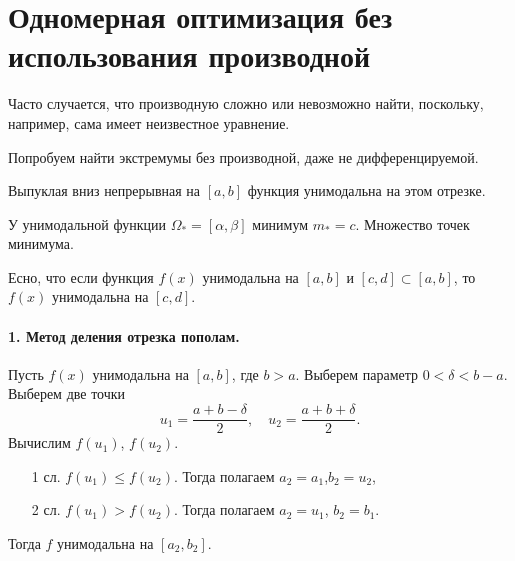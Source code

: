 \section{Одномерная оптимизация без использования производной}
Часто случается, что производную сложно или невозможно найти, поскольку,
например, сама имеет неизвестное уравнение.

Попробуем найти экстремумы без производной, даже не дифференцируемой.


\begin{remark}
  Выпуклая вниз непрерывная на $ [a, b] $ функция унимодальна на этом отрезке.
\end{remark}
\begin{remark}
  У унимодальной функции $ \Omega_\ast = [\alpha, \beta] $ минимум $ m_\ast = c
  $. Множество точек минимума.
\end{remark}
\begin{remark}
  Есно, что если функция $ f(x) $ унимодальна на $ [a, b] $ и $ [c,d] \subset
  [a,b] $, то $ f(x) $ унимодальна на $ [c, d] $.
\end{remark}
\setcounter{remark}{0}

\paragraph{1. Метод деления отрезка пополам.} Пусть $ f(x) $ унимодальна на $
[a,b] $, где $ b > a $. Выберем параметр $ 0 < \delta < b-a $. Выберем две
точки 
\[
    u_1 = \frac{a + b -\delta}{2}, \quad u_2 = \frac{a+ b+\delta}{2}.
\]
Вычислим $ f(u_1) $, $ f(u_2) $.
\begin{enumerate}
  \item[1 сл.] $ f(u_1) \leqslant f(u_2) $. Тогда полагаем $ a_2 = a_1$,$b_2=u_2
    $,
  \item[2 сл.] $ f(u_1) > f(u_2) $. Тогда полагаем $ a_2 = u_1 $, $ b_2 = b_1 $.
\end{enumerate}
Тогда $ f $ унимодальна на $ [a_2, b_2] $.

